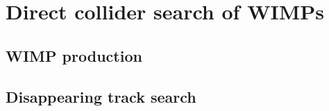 \documentclass[12pt,twoside,book]{article}
\begin{document}
\section{Direct collider search of WIMPs}
\setcounter{equation}{0}

\vskip 0.1in


\subsection{WIMP production}



\subsection{Disappearing track search}



% 
% 
\end{document}
